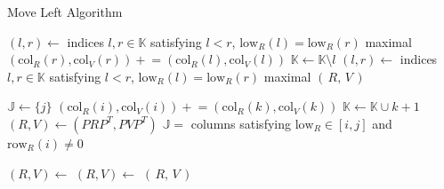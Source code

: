 \documentclass{siamart190516}
\begin{document}
\begin{algorithm}
	\caption{Move Left Algorithm}\label{alg:ml}
    \begin{algorithmic}[1]
            \State $(l, r) \gets $ indices $l, r \in \mathbb{K}$ satisfying $l < r$, $\mathrm{low}_R(l) = \mathrm{low}_R(r)$ maximal 
            	\State $(\mathrm{col}_R(r), \mathrm{col}_V(r)) \mathrel{+}= (\mathrm{col}_R(l), \mathrm{col}_V(l))$
            	\State $\mathbb{K} \gets \mathbb{K} \setminus l$
            	\State $(l, r) \gets $ indices $l, r \in \mathbb{K}$ satisfying $l < r$, $\mathrm{low}_R(l) = \mathrm{low}_R(r)$ maximal
            \EndWhile
        	\State \Return $(\, R, \, V \, )$
        \EndFunction
    \end{algorithmic}
    
    \begin{algorithmic}[1]
        	\State $\mathbb{J} \gets \{ j \}$
            	\State $(\mathrm{col}_R(i), \mathrm{col}_V(i)) \mathrel{+}= (\mathrm{col}_R(k), \mathrm{col}_V(k))$
            	\State $\mathbb{K} \gets \mathbb{K} \cup k + 1 $
            \EndWhile
            \State $(R, V) \gets (P R P^T, P V P^T)$
            \State $\mathbb{J} = $ columns satisfying $\mathrm{low}_R \in [i,j]$ and $\mathrm{row}_R(i) \neq 0$ %

            \State $(R, V) \gets$ 
            \State $(R, V) \gets$ 
			\State \Return $(\, R, \, V\,)$
        \EndFunction
    \end{algorithmic}

\end{algorithm}
\end{document}
